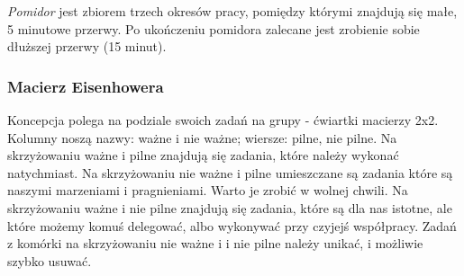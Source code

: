 \textit{Pomidor} jest zbiorem trzech okresów pracy, pomiędzy którymi znajdują się małe, 5 minutowe przerwy. Po ukończeniu pomidora zalecane jest zrobienie sobie dłuższej przerwy (15 minut).

\subsubsection{Macierz Eisenhowera} %
\label{ssub:macierz_eisenhowera}
Koncepcja polega na podziale swoich zadań na grupy - ćwiartki macierzy 2x2. Kolumny noszą nazwy: ważne i nie ważne; wiersze: pilne, nie pilne. Na skrzyżowaniu ważne i pilne znajdują się zadania, które należy wykonać natychmiast. Na skrzyżowaniu nie ważne i pilne umieszczane są zadania które są naszymi marzeniami i pragnieniami. Warto je zrobić w wolnej chwili. Na skrzyżowaniu ważne i nie pilne znajdują się zadania, które są dla nas istotne, ale które możemy komuś delegować, albo wykonywać przy czyjejś współpracy. Zadań z komórki na skrzyżowaniu nie ważne i i nie pilne należy unikać, i możliwie szybko usuwać.
